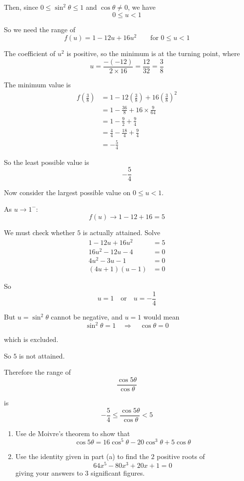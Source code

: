 \documentclass[leqno]{article}
\begin{document}
\begin{enumerate}[
  label=\textbf{\arabic*.},
  leftmargin=*,
  topsep=0pt,
  partopsep=0pt,
  parsep=0pt
]
\begin{djsSolution}
\begin{enumerate}[label=\textbf{(\roman*)}]
Then, since $0\le \sin^2\theta \le 1$ and $\cos\theta\ne 0$, we have
\[
0\le u<1
\]

So we need the range of
\[
f(u)=1-12u+16u^2
\qquad \text{for } 0\le u<1
\]

The coefficient of \(u^2\) is positive, so the minimum is at the turning point, where
\[
u=\frac{-(-12)}{2\times 16}=\frac{12}{32}=\frac{3}{8}
\]

The minimum value is
\begin{align*}
f\left(\frac38\right)
&=1-12\left(\frac38\right)+16\left(\frac38\right)^2 \\
&=1-\frac{36}{8}+16\times\frac{9}{64} \\
&=1-\frac92+\frac94 \\
&=\frac44-\frac{18}{4}+\frac94 \\
&=-\frac54
\end{align*}

So the least possible value is
\[
-\frac54
\]

Now consider the largest possible value on $0\le u<1$.

As $u\to 1^{-}$:
\[
f(u)\to 1-12+16=5
\]

We must check whether $5$ is actually attained. Solve
\begin{align*}
1-12u+16u^2 &= 5 \\
16u^2-12u-4 &= 0 \\
4u^2-3u-1 &= 0 \\
(4u+1)(u-1)&=0
\end{align*}

So
\[
u=1 \quad \text{or} \quad u=-\frac14
\]

But $u=\sin^2\theta$ cannot be negative, and $u=1$ would mean
\[
\sin^2\theta=1\quad\Longrightarrow\quad\cos\theta=0
\]

which is excluded.

So $5$ is not attained.

Therefore the range of
\[
\frac{\cos 5\theta}{\cos\theta}
\]

is
\[
-\frac54 \leq \frac{\cos 5\theta}{\cos\theta} < 5
\]

\end{enumerate}
\end{djsSolution}


\newpage

\questionitem

\begin{enumerate}[label=\textbf{(\alph*)}]
  \item Use de Moivre's theorem to show that
  \[
  \cos 5\theta = 16\cos^5 \theta - 20\cos^3 \theta + 5\cos \theta
  \]
  \item Use the identity given in part (a) to find the $2$ positive roots of
  \[
  64x^5 - 80x^3 + 20x + 1 = 0
  \]
  giving your answers to $3$ significant figures.  \\
\end{enumerate}


\end{enumerate}
\end{document}
